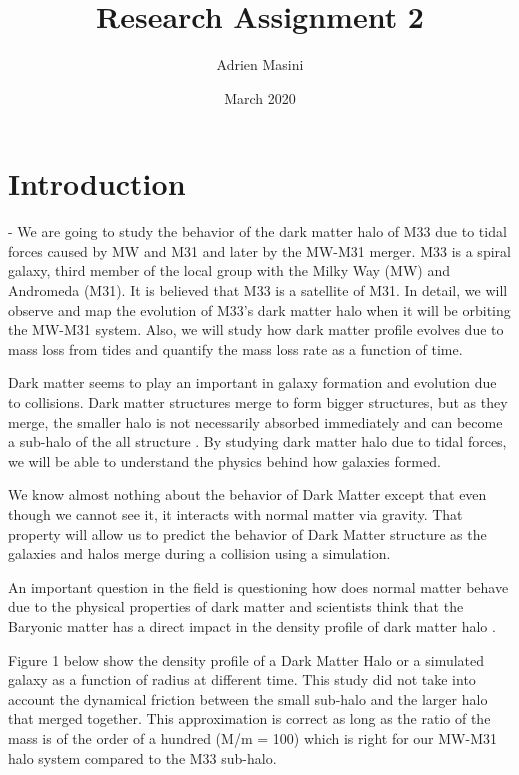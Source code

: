 \documentclass{article}
\title{Research Assignment 2}
\author{Adrien Masini }
\date{March 2020}
\begin{document}
\maketitle
\section{Introduction}


- We are going to study the behavior of the dark matter halo of M33 due to tidal forces caused by MW and M31 and later by the MW-M31 merger. M33 is a spiral galaxy, third member of the local group with the Milky Way (MW) and Andromeda (M31). It is believed that M33 is a satellite of M31. In detail, we will observe and map the evolution of M33's dark matter halo when it will be orbiting the MW-M31 system. Also, we will study how dark matter profile evolves due to mass loss from tides and quantify the mass loss rate as a function of time.
\vspace{0.5mm}

Dark matter seems to play an important in galaxy formation and  evolution due to collisions. Dark matter structures merge to form bigger structures, but as they merge, the smaller halo is not necessarily absorbed immediately and can become a sub-halo of the all structure \cite{Delos19}. By studying dark matter halo due to tidal forces, we will be able to understand the physics behind how galaxies formed.
\vspace{0.5mm}

We know almost nothing about the behavior of Dark Matter except that even though we cannot see it, it interacts with normal matter via gravity. That property will allow us to predict the behavior of Dark Matter structure as the galaxies and halos merge during a collision using a simulation.
\vspace{0.5mm}

An important question in the field is questioning how does normal matter behave due to the physical properties of dark matter \cite{Wechsler18} and scientists think that the Baryonic matter has a direct impact in the density profile of dark matter halo \cite{Grillo12}.
\vspace{5mm}

Figure 1 below show the density profile of a Dark Matter Halo or a simulated galaxy as a function of radius at different time. This study did not take into account the dynamical friction between  the small sub-halo and the larger halo that merged together. This approximation is correct as long as the ratio of the mass is of the order of a hundred (M/m = 100) which is right for our MW-M31 halo system compared to the M33 sub-halo.
\end{document}
